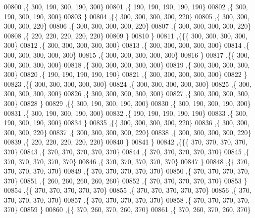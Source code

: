 \begin{DoxyCode}
00800    ,\{   300,   190,   300,   190,   300\}
00801    ,\{   190,   190,   190,   190,   190\}
00802    ,\{   300,   190,   300,   190,   300\}
00803    \}
00804   ,\{\{   300,   300,   300,   300,   220\}
00805    ,\{   300,   300,   300,   300,   220\}
00806    ,\{   300,   300,   300,   300,   220\}
00807    ,\{   300,   300,   300,   300,   220\}
00808    ,\{   220,   220,   220,   220,   220\}
00809    \}
00810   \}
00811  ,\{\{\{   300,   300,   300,   300,   300\}
00812    ,\{   300,   300,   300,   300,   300\}
00813    ,\{   300,   300,   300,   300,   300\}
00814    ,\{   300,   300,   300,   300,   300\}
00815    ,\{   300,   300,   300,   300,   300\}
00816    \}
00817   ,\{\{   300,   300,   300,   300,   300\}
00818    ,\{   300,   300,   300,   300,   300\}
00819    ,\{   300,   300,   300,   300,   300\}
00820    ,\{   190,   190,   190,   190,   190\}
00821    ,\{   300,   300,   300,   300,   300\}
00822    \}
00823   ,\{\{   300,   300,   300,   300,   300\}
00824    ,\{   300,   300,   300,   300,   300\}
00825    ,\{   300,   300,   300,   300,   300\}
00826    ,\{   300,   300,   300,   300,   300\}
00827    ,\{   300,   300,   300,   300,   300\}
00828    \}
00829   ,\{\{   300,   190,   300,   190,   300\}
00830    ,\{   300,   190,   300,   190,   300\}
00831    ,\{   300,   190,   300,   190,   300\}
00832    ,\{   190,   190,   190,   190,   190\}
00833    ,\{   300,   190,   300,   190,   300\}
00834    \}
00835   ,\{\{   300,   300,   300,   300,   220\}
00836    ,\{   300,   300,   300,   300,   220\}
00837    ,\{   300,   300,   300,   300,   220\}
00838    ,\{   300,   300,   300,   300,   220\}
00839    ,\{   220,   220,   220,   220,   220\}
00840    \}
00841   \}
00842  ,\{\{\{   370,   370,   370,   370,   370\}
00843    ,\{   370,   370,   370,   370,   370\}
00844    ,\{   370,   370,   370,   370,   370\}
00845    ,\{   370,   370,   370,   370,   370\}
00846    ,\{   370,   370,   370,   370,   370\}
00847    \}
00848   ,\{\{   370,   370,   370,   370,   370\}
00849    ,\{   370,   370,   370,   370,   370\}
00850    ,\{   370,   370,   370,   370,   370\}
00851    ,\{   260,   260,   260,   260,   260\}
00852    ,\{   370,   370,   370,   370,   370\}
00853    \}
00854   ,\{\{   370,   370,   370,   370,   370\}
00855    ,\{   370,   370,   370,   370,   370\}
00856    ,\{   370,   370,   370,   370,   370\}
00857    ,\{   370,   370,   370,   370,   370\}
00858    ,\{   370,   370,   370,   370,   370\}
00859    \}
00860   ,\{\{   370,   260,   370,   260,   370\}
00861    ,\{   370,   260,   370,   260,   370\}

\end{DoxyCode}
